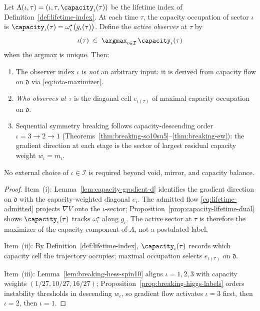 \begin{theorem}\label{thm:iota-derived}
Let $\Lambda(\iota,\tau)=(\iota,\tau,\capacity_\iota(\tau))$ be the lifetime
index of Definition~\ref{def:lifetime-index}. At each time $\tau$, the
capacity occupation of sector $\iota$ is
$\capacity_\iota(\tau)=\omega^\star_\iota\bigl(g_\iota(\tau)\bigr)$.
Define the \emph{active observer} at $\tau$ by
\begin{equation}\label{eq:iota-maximizer}
  \iota(\tau)\;\in\;\argmax_{\iota\in\mathcal{I}}\,\capacity_\iota(\tau)
\end{equation}
when the argmax is unique. Then:
\begin{enumerate}[label=(\roman*),leftmargin=*]
  \item The observer index $\iota$ is \emph{not} an arbitrary input: it is
    derived from capacity flow on $\mathfrak{d}$ via
    \eqref{eq:iota-maximizer}.
  \item \emph{Who observes at $\tau$} is the diagonal cell $e_{\iota(\tau)}$
    of maximal capacity occupation on $\mathfrak{d}$.
  \item Sequential symmetry breaking follows capacity-descending order
    $\iota=3\to2\to1$
    (Theorems~\ref{thm:breaking-so10su5}--\ref{thm:breaking-ew}): the gradient
    direction at each stage is the sector of largest residual capacity weight
    $w_\iota=m_\iota$.
\end{enumerate}
No external choice of $\iota\in\mathcal{I}$ is required beyond void, mirror,
and capacity balance.
\end{theorem}

\begin{proof}
Item~(i): Lemma~\ref{lem:capacity-gradient-d} identifies the gradient
direction on $\mathfrak{d}$ with the capacity-weighted diagonal $e_i$. The
admitted flow \eqref{eq:lifetime-admitted} projects $\nabla V$ onto the
$\iota$-sector; Proposition~\ref{prop:capacity-lifetime-dual} shows
$\capacity_\iota(\tau)$ tracks $\omega^\star_\iota$ along $g_\iota$. The
active sector at $\tau$ is therefore the maximizer of the capacity component
of $\Lambda$, not a postulated label.

Item~(ii): By Definition~\ref{def:lifetime-index}, $\capacity_\iota(\tau)$
records which capacity cell the trajectory occupies; maximal occupation
selects $e_{\iota(\tau)}$ on $\mathfrak{d}$.

Item~(iii): Lemma~\ref{lem:breaking-hess-spin10} aligns
$\iota=1,2,3$ with capacity weights $(1/27,10/27,16/27)$;
Proposition~\ref{prop:breaking-higgs-labels} orders instability thresholds in
descending $w_\iota$, so gradient flow activates $\iota=3$ first, then
$\iota=2$, then $\iota=1$.
\end{proof}

